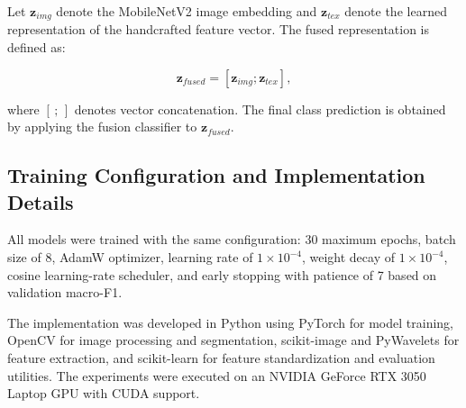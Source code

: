Let $\mathbf{z}_{img}$ denote the MobileNetV2 image embedding and $\mathbf{z}_{tex}$ denote the learned representation of the handcrafted feature vector. The fused representation is defined as:

\begin{equation}
\mathbf{z}_{fused} = [\mathbf{z}_{img}; \mathbf{z}_{tex}],
\end{equation}

where $[\,;\,]$ denotes vector concatenation. The final class prediction is obtained by applying the fusion classifier to $\mathbf{z}_{fused}$.


\subsection{Training Configuration and Implementation Details}

All models were trained with the same configuration: 30 maximum epochs, batch size of 8, AdamW optimizer, learning rate of $1 \times 10^{-4}$, weight decay of $1 \times 10^{-4}$, cosine learning-rate scheduler, and early stopping with patience of 7 based on validation macro-F1.

The implementation was developed in Python using PyTorch for model training, OpenCV for image processing and segmentation, scikit-image and PyWavelets for feature extraction, and scikit-learn for feature standardization and evaluation utilities. The experiments were executed on an NVIDIA GeForce RTX 3050 Laptop GPU with CUDA support.